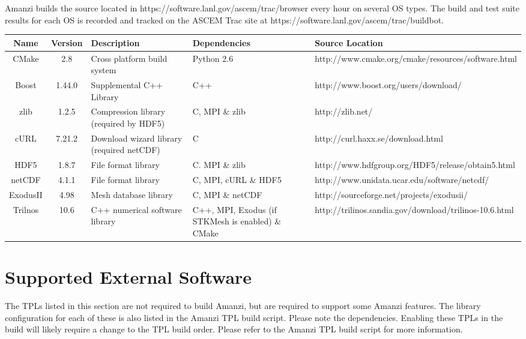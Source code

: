 \documentclass[12pt]{article}
\begin{document}
Amanzi builds the source located in https://software.lanl.gov/ascem/trac/browser every hour on several OS types.
The build and test suite results for each OS is recorded and tracked on the ASCEM Trac
site at https://software.lanl.gov/ascem/trac/buildbot. 

\begin{table}[htdp]
\begin{center}
\begin{tabular}{|c|c|p{3cm}|p{3cm}|p{3cm}|}
\hline
\hline
Name & Version & Description & Dependencies & Source Location \\
\hline
CMake & 2.8 & Cross platform build system & Python 2.6 & http://www.cmake.org/cmake/resources/software.html \\
\hline
Boost & 1.44.0 & Supplemental C++ Library & C++ &  http://www.boost.org/users/download/\\
\hline
zlib & 1.2.5 &Compression library (required by HDF5) & C, MPI \& zlib &  http://zlib.net/ \\
\hline
cURL & 7.21.2 & Download wizard library (required netCDF) & C & http://curl.haxx.se/download.html \\
\hline
HDF5 &1.8.7 & File format library & C. MPI \& zlib & http://www.hdfgroup.org/HDF5/release/obtain5.html \\
\hline
netCDF & 4.1.1 & File format library & C, MPI, cURL \& HDF5 & http://www.unidata.ucar.edu/software/netcdf/ \\
\hline
ExodusII & 4.98 & Mesh database library & C, MPI \& netCDF & http://sourceforge.net/projects/exodusii/\\
\hline
Trilnos & 10.6 & C++ numerical software library & C++, MPI, Exodus (if STKMesh is enabled) \& CMake & http://trilinos.sandia.gov/download/trilinos-10.6.html \\
\hline
\hline
\end{tabular}
\end{center}
\label{default}
\end{table}%


\section*{Supported External Software}
The TPLs listed in this section are not required to build Amanzi, but are required to support some Amanzi features. The 
library configuration for each of these is also listed in the Amanzi TPL build script. Please note the dependencies. Enabling
these TPLs in the build will likely require a change to the TPL build order. Please refer to the Amanzi TPL build script for
more information.
\end{document}
